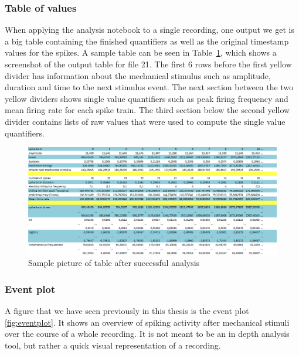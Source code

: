 \subsubsection{Table of values}
When applying the analysis notebook to a single recording, one output we get is a big table containing the finished quantifiers as well as the original timestamp values for the spikes. A sample table can be seen in Table~\ref{fig:table_sc}, which shows a screenshot of the output table for file 21. The first 6 rows before the first yellow divider has information about the mechanical stimulus such as amplitude, duration and time to the next stimulus event. The next section between the two yellow dividers shows single value quantifiers such as peak firing frequency and mean firing rate for each spike train. The third section below the second yellow divider contains lists of raw values that were used to compute the single value quantifiers.\\
\begin{figure}
	\includegraphics[width = \textwidth]{src/pic/sc_table}
	\caption{Sample picture of table after successful analysis }
	\label{fig:table_sc}
\end{figure}

\subsubsection{Event plot}
A figure that we have seen previously in this thesis is the event plot \ref{fig:eventplot}. It shows an overview of spiking activity after mechanical stimuli over the course of a whole recording. It is not meant to be an in depth analysis tool, but rather a quick visual representation of a recording.

